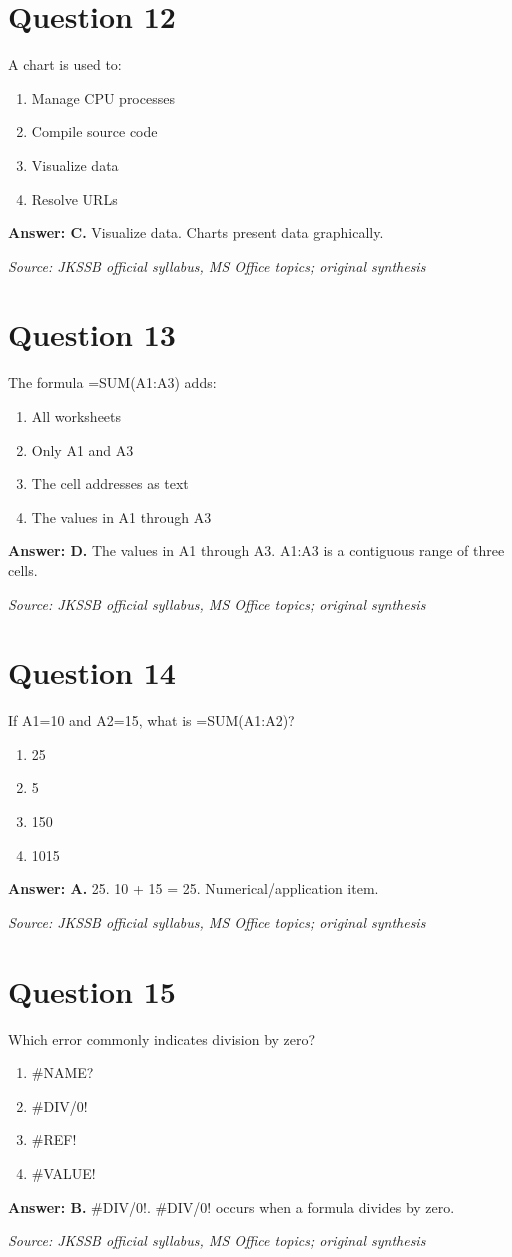 \documentclass[11pt,a4paper]{book}
\newcommand{\source}[1]{\par\smallskip\textit{Source: #1}}
\newcommand{\answer}[2]{\par\textbf{Answer: #1.} #2}
\begin{document}
\section*{Question 12}
A chart is used to:
\begin{enumerate}[label=\Alph*.]
\item Manage CPU processes
\item Compile source code
\item Visualize data
\item Resolve URLs
\end{enumerate}
\answer{C}{Visualize data. Charts present data graphically.}
\source{JKSSB official syllabus, MS Office topics; original synthesis}
\section*{Question 13}
The formula =SUM(A1:A3) adds:
\begin{enumerate}[label=\Alph*.]
\item All worksheets
\item Only A1 and A3
\item The cell addresses as text
\item The values in A1 through A3
\end{enumerate}
\answer{D}{The values in A1 through A3. A1:A3 is a contiguous range of three cells.}
\source{JKSSB official syllabus, MS Office topics; original synthesis}
\section*{Question 14}
If A1=10 and A2=15, what is =SUM(A1:A2)?
\begin{enumerate}[label=\Alph*.]
\item 25
\item 5
\item 150
\item 1015
\end{enumerate}
\answer{A}{25. 10 + 15 = 25. Numerical/application item.}
\source{JKSSB official syllabus, MS Office topics; original synthesis}
\section*{Question 15}
Which error commonly indicates division by zero?
\begin{enumerate}[label=\Alph*.]
\item \#NAME?
\item \#DIV/0!
\item \#REF!
\item \#VALUE!
\end{enumerate}
\answer{B}{\#DIV/0!. \#DIV/0! occurs when a formula divides by zero.}
\source{JKSSB official syllabus, MS Office topics; original synthesis}
\end{document}
